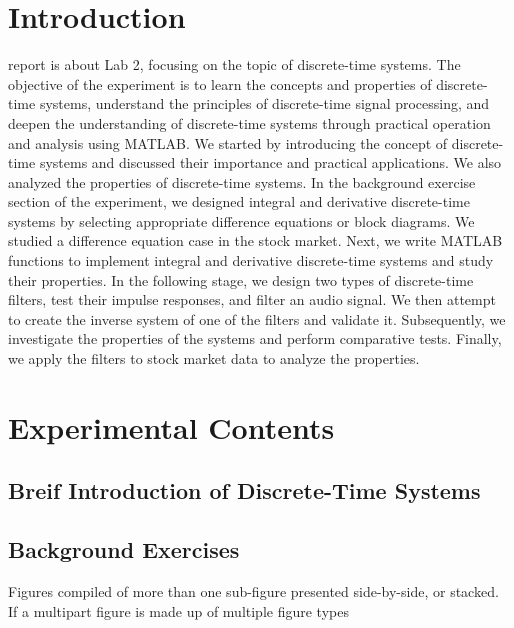 \documentclass[journal]{IEEEtran}
\begin{document}
\section{Introduction}
 report is about Lab 2, focusing on the topic of discrete-time systems. The objective of the experiment is to learn the concepts and properties of discrete-time systems, understand the principles of discrete-time signal processing, and deepen the understanding of discrete-time systems through practical operation and analysis using MATLAB. We started by introducing the concept of discrete-time systems and discussed their importance and practical applications. We also analyzed the properties of discrete-time systems. In the background exercise section of the experiment, we designed integral and derivative discrete-time systems by selecting appropriate difference equations or block diagrams. We studied a difference equation case in the stock market. Next, we write MATLAB functions to implement integral and derivative discrete-time systems and study their properties. In the following stage, we design two types of discrete-time filters, test their impulse responses, and filter an audio signal. We then attempt to create the inverse system of one of the filters and validate it. Subsequently, we investigate the properties of the systems and perform comparative tests. Finally, we apply the filters to stock market data to analyze the properties.





\section{Experimental Contents}
\label{sec:guidelines}


\subsection{Breif Introduction of Discrete-Time Systems}



\subsection{Background Exercises}
Figures compiled of more than one sub-figure presented side-by-side, or 
stacked. If a multipart figure is made up of multiple figure
types 
\end{document}
